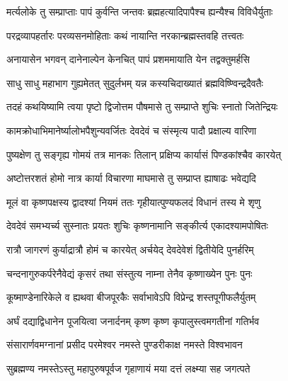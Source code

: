 \hyperref[sec:ekadashi_mahatmyam_vrata_raja]{\closesub}
\clearpage

\label{sec:vrata-raja-magha-krishna-shattila}


\twolineshloka
{मर्त्यलोके तु सम्प्राप्ताः पापं कुर्वन्ति जन्तवः}
{ब्रह्महत्यादिपापैश्च ह्यन्यैश्च विविधैर्युताः} %

\twolineshloka
{परद्रव्यापहर्तारः परव्यसनमोहिताः}
{कथं नायान्ति नरकान्ब्रह्मस्तवहि तत्त्वतः} %

\twolineshloka
{अनायासेन भगवन् दानेनाल्पेन केनचित्}
{पापं प्रशममायाति येन तद्वक्तुमर्हसि} %


\twolineshloka
{साधु साधु महाभाग गुह्यमेतत् सुदुर्लभम्}
{यन्न कस्यचिदाख्यातं ब्रह्मविष्ण्विन्द्रदैवतैः} %

\twolineshloka
{तदहं कथयिष्यामि त्वया पृष्टो द्विजोत्तम}
{पौषमासे तु सम्प्राप्ते शुचिः स्नातो जितेन्द्रियः} %

\twolineshloka
{कामक्रोधाभिमानेर्ष्यालोभपैशुन्यवर्जितः}
{देवदेवं च संस्मृत्य पादौ प्रक्षाल्य वारिणा} %

\twolineshloka
{पुष्यक्षेण तु सङ्गृह्य गोमयं तत्र मानकः}
{तिलान् प्रक्षिप्य कार्यासं पिण्डकांश्चैव कारयेत्} %

\twolineshloka
{अष्टोत्तरशतं होमो नात्र कार्या विचारणा}
{माघमासे तु सम्प्राप्त ह्याषाढः भवेद्यदि} %

\twolineshloka
{मूलं वा कृष्णपक्षस्य द्वादश्यां नियमं ततः}
{गृहीयात्पुण्यफलदं विधानं तस्य मे शृणु} %

\twolineshloka
{देवदेवं समभ्यर्च्य सुस्नातः प्रयतः शुचिः}
{कृष्णनामानि सङ्कीर्त्य एकादश्यामपोषितः} %

\twolineshloka
{रात्रौ जागरणं कुर्याद्रात्रौ होमं च कारयेत्}
{अर्चयेद् देवदेवेशं द्वितीयेदि पुनर्हरिम्} %

\twolineshloka
{चन्दनागुरुकर्परेनैवेद्यं कृसरं तथा}
{संस्तुत्य नाम्ना तेनैव कृष्णाख्येन पुनः पुनः} %

\twolineshloka
{कूष्माण्डेनारिकेले व ह्यथवा बीजपूरकैः}
{सर्वाभावेऽपि विप्रेन्द्र शस्तपूगीफलैर्युतम्} %

\twolineshloka
{अर्घं दद्याद्विधानेन पूजयित्वा जनार्दनम्}
{कृष्ण कृष्ण कृपालुस्त्वमगतीनां गतिर्भव} %

\twolineshloka
{संसारार्णवमग्नानां प्रसीद परमेश्वर}
{नमस्ते पुण्डरीकाक्ष नमस्ते विश्वभावन} %

\twolineshloka
{सुब्रह्मण्य नमस्तेऽस्तु महापुरुषपूर्वज}
{गृहाणायं मया दत्तं लक्ष्म्या सह जगत्पते} %

